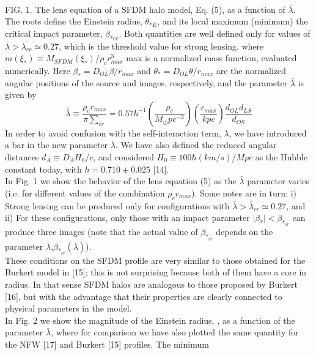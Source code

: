 \documentclass{article}
\begin{document}
\begin{multicols}{2}[]
\\FIG. 1. The lens equation of a SFDM halo model, Eq. (5), as
a function of $\bar{\lambda}$. The roots define the Einstein radius, $\theta_{*E}$, and
its local maximum (minimum) the critical impact parameter,
$\beta_{*cr}$. Both quantities are well defined only for values of $\bar{\lambda}>\bar{\lambda_{cr}}\simeq0.27$, which is the threshold value for strong lensing.
\vspace{5mm}
where $m(\xi_*)\equiv{M_{SFDM}}(\xi_*)/\rho_cr{^3_{max}}$ max is a normalized mass function, evaluated numerically. Here $\beta_*=D_{OL}\beta/r_{max}$ and $\theta_*=D_{OL}\theta/r_{max}$ are the normalized angular positions of the source and images, respectively, and the parameter $\bar{\lambda}$ is given by
\begin{equation}
    \bar{\lambda}\equiv\frac{\rho_cr_{max}}{\pi{\sum}_{cr}}=0.57h^{-1}(\frac{\rho_c}{M_\odot{pc^{-3}}})(\frac{r_{max}}{kpc})\frac{d_{OL}d_{LS}}{d_{OS}}
\end{equation}
\vspace{5mm}
In order to avoid confusion with the self-interaction term,
$\lambda$, we have introduced a bar in the new parameter $\bar{\lambda}$. We have also defined the reduced angular distances $d_A\equiv{D_AH_0/c}$, and considered $H_0{\equiv}100\hbar(km/s)/Mpc$ as the
Hubble constant today, with $h = 0.710 \pm 0.025$ [14].
\\In Fig. 1 we show the behavior of the lens equation (5)
as the $\bar{\lambda}$ parameter varies (i.e. for different values of the
combination $\rho_cr_{max}$). Some notes are in turn: i) Strong lensing can be produced only for configurations with $\bar{\lambda}>\bar{\lambda}_{cr}{\simeq}0.27$, and ii) For these configurations, only those
with an impact parameter $|\beta_*| < \beta_{*}_{cr}$ can produce three
images (note that the actual value of $\beta_{*}_{cr}$ depends on the
parameter $\bar{\lambda}$,$\beta_{*}_{cr}(\bar{\lambda})$).
\\These conditions on the SFDM profile are very similar
to those obtained for the Burkert model in [15]; this is not surprising because both of them have a core in radius. In
that sense SFDM halos are analogous to those proposed by Burkert [16], but with the advantage that their properties are clearly connected to physical parameters in the model.
\\In Fig. 2 we show the magnitude of the Einstein radius, , as a function of the parameter $\bar{\lambda}$, where for
comparison we have also plotted the same quantity for
the NFW [17] and Burkert [15] profiles. The minimum

\end{multicols}
\end{document}
